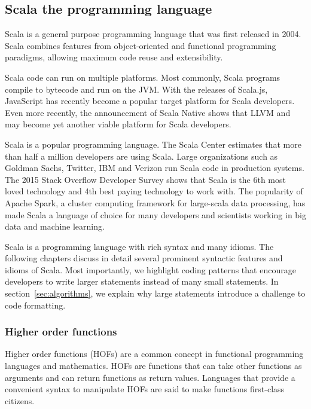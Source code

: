 \documentclass[11pt,a4paper]{article}
\begin{document}
\subsection{Scala the programming language}
Scala\autocite{odersky_scala_2004} is a general purpose programming language that was first released in 2004.
Scala combines features from object-oriented and functional programming paradigms, allowing maximum code reuse and extensibility.

Scala code can run on multiple platforms.
Most commonly, Scala programs compile to bytecode and run on the JVM.
With the releases of Scala.js\autocite{_scala.js_????-1}, JavaScript has recently become a popular target platform for Scala developers.
Even more recently, the announcement of Scala Native\autocite{_scala-native/scala-native_????} shows that LLVM and may become yet another viable platform for Scala developers.

Scala is a popular programming language.
The Scala Center estimates that more than half a million developers are using Scala\autocite{odersky_scala_2016}.
Large organizations such as Goldman Sachs, Twitter, IBM and Verizon run Scala code in production systems.
The 2015 Stack Overflow Developer Survey shows that Scala is the 6th most loved technology and 4th best paying technology to work with\autocite{_stack_????}.
The popularity of Apache Spark\autocite{_apache_????-1}, a cluster computing framework for large-scala data processing, has made Scala a language of choice for many developers and scientists working in big data and machine learning.

Scala is a programming language with rich syntax and many idioms.
The following chapters discuss in detail several prominent syntactic features and idioms of Scala.
Most importantly, we highlight coding patterns that encourage developers to write larger statements instead of many small statements.
In section~\ref{sec:algorithms}, we explain why large statements introduce a challenge to code formatting.

\subsubsection{Higher order functions}
Higher order functions (HOFs) are a common concept in functional programming languages and mathematics.
HOFs are functions that can take other functions as arguments and can return functions as return values.
Languages that provide a convenient syntax to manipulate HOFs are said to make functions first-class citizens.
\end{document}
